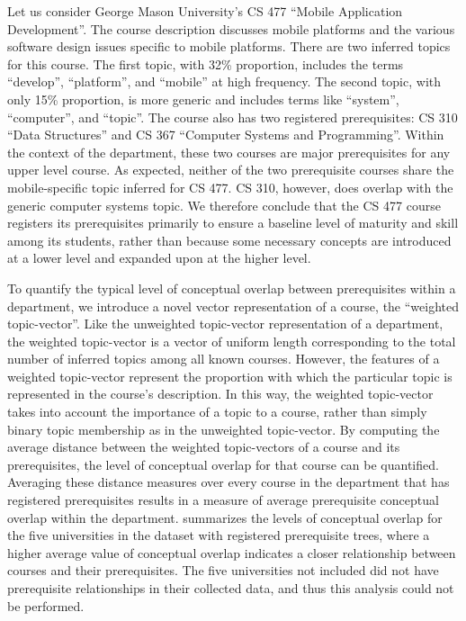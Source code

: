 
Let us consider George Mason University's CS 477 ``Mobile Application Development''.
The course description discusses mobile platforms and the various software design issues specific to mobile platforms.
There are two inferred topics for this course.
The first topic, with 32\% proportion, includes the terms ``develop'', ``platform'', and ``mobile'' at high frequency.
The second topic, with only 15\% proportion, is more generic and includes terms like ``system'', ``computer'', and ``topic''.
The course also has two registered prerequisites: CS 310 ``Data Structures'' and CS 367 ``Computer Systems and Programming''.
Within the context of the department, these two courses are major prerequisites for any upper level course.
As expected, neither of the two prerequisite courses share the mobile-specific topic inferred for CS 477.
CS 310, however, does overlap with the generic computer systems topic.
We therefore conclude that the CS 477 course registers its prerequisites primarily to ensure a baseline level of maturity and skill among its students, rather than because some necessary concepts are introduced at a lower level and expanded upon at the higher level.


To quantify the typical level of conceptual overlap between prerequisites within a department, we introduce a novel vector representation of a course, the ``weighted topic-vector''.
Like the unweighted topic-vector representation of a department, the weighted topic-vector is a vector of uniform length corresponding to the total number of inferred topics among all known courses.
However, the features of a weighted topic-vector represent the proportion with which the particular topic is represented in the course's description.
In this way, the weighted topic-vector takes into account the importance of a topic to a course, rather than simply binary topic membership as in the unweighted topic-vector.
By computing the average distance between the weighted topic-vectors of a course and its prerequisites, the level of conceptual overlap for that course can be quantified.
Averaging these distance measures over every course in the department that has registered prerequisites results in a measure of average prerequisite conceptual overlap within the department.
 summarizes the levels of conceptual overlap for the five universities in the dataset with registered prerequisite trees, where a higher average value of conceptual overlap indicates a closer relationship between courses and their prerequisites.
The five universities not included did not have prerequisite relationships in their collected data, and thus this analysis could not be performed.

